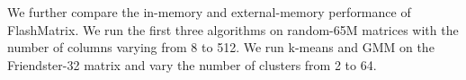 We further compare the in-memory and external-memory performance of FlashMatrix.
We run the first three algorithms on random-65M matrices
with the number of columns varying from 8 to 512. We run k-means
and GMM on the Friendster-32 matrix and vary the number of clusters from 2 to 64.

